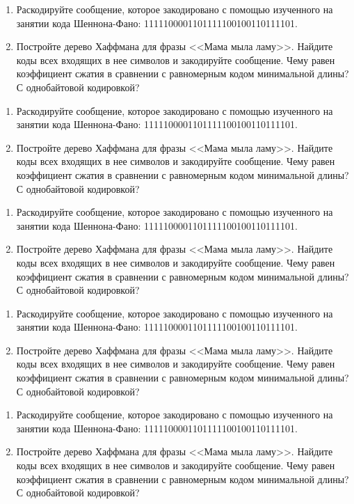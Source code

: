 \documentclass[12pt]{article}
\begin{document}
\begin{enumerate}
\item Раскодируйте сообщение, которое закодировано с помощью изученного на занятии кода Шеннона-Фано: 1111100001101111100100110111101.
\item Постройте дерево Хаффмана для фразы <<Мама мыла ламу>>. Найдите коды всех входящих в нее символов и закодируйте сообщение. Чему равен коэффициент сжатия в сравнении с равномерным кодом минимальной длины? С однобайтовой кодировкой?
\end{enumerate}

\begin{enumerate}
\item Раскодируйте сообщение, которое закодировано с помощью изученного на занятии кода Шеннона-Фано: 1111100001101111100100110111101.
\item Постройте дерево Хаффмана для фразы <<Мама мыла ламу>>. Найдите коды всех входящих в нее символов и закодируйте сообщение. Чему равен коэффициент сжатия в сравнении с равномерным кодом минимальной длины? С однобайтовой кодировкой?
\end{enumerate}

\begin{enumerate}
\item Раскодируйте сообщение, которое закодировано с помощью изученного на занятии кода Шеннона-Фано: 1111100001101111100100110111101.
\item Постройте дерево Хаффмана для фразы <<Мама мыла ламу>>. Найдите коды всех входящих в нее символов и закодируйте сообщение. Чему равен коэффициент сжатия в сравнении с равномерным кодом минимальной длины? С однобайтовой кодировкой?
\end{enumerate}

\begin{enumerate}
\item Раскодируйте сообщение, которое закодировано с помощью изученного на занятии кода Шеннона-Фано: 1111100001101111100100110111101.
\item Постройте дерево Хаффмана для фразы <<Мама мыла ламу>>. Найдите коды всех входящих в нее символов и закодируйте сообщение. Чему равен коэффициент сжатия в сравнении с равномерным кодом минимальной длины? С однобайтовой кодировкой?
\end{enumerate}

\begin{enumerate}
\item Раскодируйте сообщение, которое закодировано с помощью изученного на занятии кода Шеннона-Фано: 1111100001101111100100110111101.
\item Постройте дерево Хаффмана для фразы <<Мама мыла ламу>>. Найдите коды всех входящих в нее символов и закодируйте сообщение. Чему равен коэффициент сжатия в сравнении с равномерным кодом минимальной длины? С однобайтовой кодировкой?
\end{enumerate}
\end{document}
